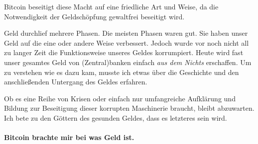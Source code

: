 Bitcoin beseitigt diese Macht auf eine friedliche Art und Weise, da die
Notwendigkeit der Geldschöpfung gewaltfrei beseitigt wird.

Geld durchlief mehrere Phasen. Die meisten Phasen waren gut. Sie haben unser
Geld auf die eine oder andere Weise verbessert. Jedoch wurde vor noch nicht all
zu langer Zeit die Funktionsweise unseres Geldes korrumpiert. Heute wird fast
unser gesamtes Geld von (Zentral)banken einfach \textit{aus dem Nichts}
erschaffen. Um zu verstehen wie es dazu kam, musste ich etwas über die
Geschichte und den anschließenden Untergang des Geldes erfahren.

Ob es eine Reihe von Krisen oder einfach nur umfangreiche Aufklärung und Bildung
zur Beseitigung dieser korrupten Maschinerie braucht, bleibt abzuwarten. Ich
bete zu den Göttern des gesunden Geldes, dass es letzteres sein wird.

\paragraph{Bitcoin brachte mir bei was Geld ist.}

%
%
%
%

